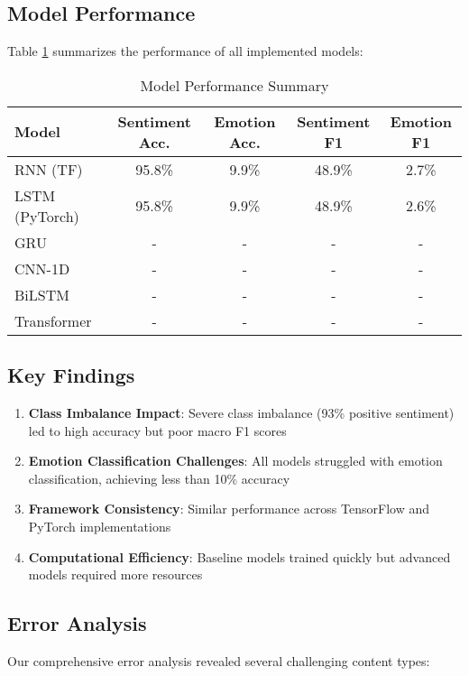 \documentclass[11pt,a4paper]{article}
\begin{document}
\subsection{Model Performance}

Table \ref{tab:results} summarizes the performance of all implemented models:

\begin{table}[H]
\centering
\begin{tabular}{lcccc}
\toprule
Model & Sentiment Acc. & Emotion Acc. & Sentiment F1 & Emotion F1 \\
\midrule
RNN (TF) & 95.8\% & 9.9\% & 48.9\% & 2.7\% \\
LSTM (PyTorch) & 95.8\% & 9.9\% & 48.9\% & 2.6\% \\
GRU & - & - & - & - \\
CNN-1D & - & - & - & - \\
BiLSTM & - & - & - & - \\
Transformer & - & - & - & - \\
\bottomrule
\end{tabular}
\caption{Model Performance Summary}
\label{tab:results}
\end{table}

\subsection{Key Findings}

\begin{enumerate}
    \item \textbf{Class Imbalance Impact}: Severe class imbalance (93\% positive sentiment) led to high accuracy but poor macro F1 scores
    \item \textbf{Emotion Classification Challenges}: All models struggled with emotion classification, achieving less than 10\% accuracy
    \item \textbf{Framework Consistency}: Similar performance across TensorFlow and PyTorch implementations
    \item \textbf{Computational Efficiency}: Baseline models trained quickly but advanced models required more resources
\end{enumerate}

\subsection{Error Analysis}

Our comprehensive error analysis revealed several challenging content types:
\end{document}
